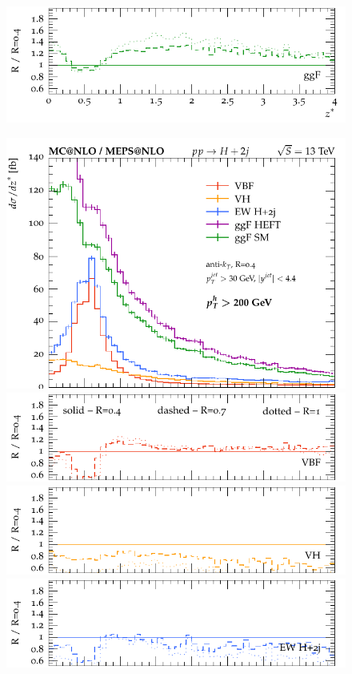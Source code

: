 \documentclass[10pt,prd,fleqn,superscriptaddress,notitlepage,nofootinbib,preprintnumbers,nobalancelastpage]{revtex4-1}
\begin{document}
\begin{figure}[p]
\begin{minipage}{.295\textwidth}
    \includegraphics[width=\textwidth]{figures/channels/z_star_rGGH.pdf}
  \end{minipage}\hfill
  \begin{minipage}{.295\textwidth}
    \includegraphics[width=\textwidth]{figures/channels/z_star_pth200.pdf}
    \includegraphics[width=\textwidth]{figures/channels/z_star_pth200_rVBF.pdf}
    \includegraphics[width=\textwidth]{figures/channels/z_star_pth200_rVH.pdf}
    \includegraphics[width=\textwidth]{figures/channels/z_star_pth200_rHJJ.pdf}

\end{minipage}
\end{figure}
\end{document}
